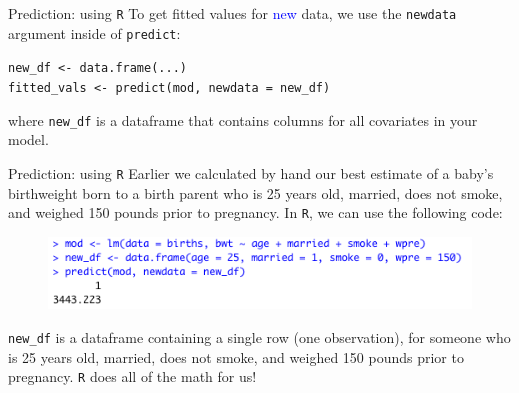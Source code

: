 \documentclass[10pt,t]{beamer}
\begin{document}
\begin{frame}{Prediction: using \texttt{R}}
To get fitted values for \textcolor{blue}{new} data, we use the \texttt{newdata} argument inside of \texttt{predict}:

\vspace{0.3cm}

\texttt{new\_df <- data.frame(...)} \\
\texttt{fitted\_vals <- predict(mod, newdata = new\_df)}

\vspace{0.3cm}

where \texttt{new\_df} is a dataframe that contains columns for all covariates in your model.

\end{frame}

\begin{frame}{Prediction: using \texttt{R}}
Earlier we calculated by hand our best estimate of a baby's birthweight born to a birth parent who is 25 years old, married, does not smoke, and weighed 150 pounds prior to pregnancy. In \texttt{R}, we can use the following code:

\vspace{0.3cm}

\begin{figure}
	\centering \includegraphics[scale=0.5]{figures/newdata_example.png}
\end{figure}

\vspace{0.3cm}

\texttt{new\_df} is a dataframe containing a single row (one observation), for someone who is 25 years old, married, does not smoke, and weighed 150 pounds prior to pregnancy. \texttt{R} does all of the math for us!

\end{frame}
\end{document}
